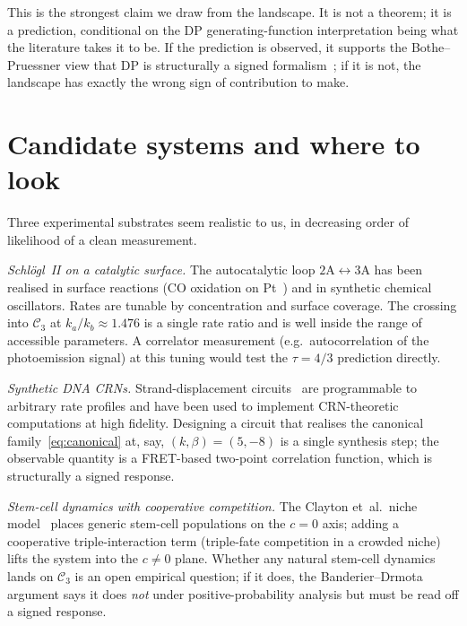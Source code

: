 \documentclass[11pt,a4paper]{article}
\newcommand{\Ck}{\mathcal{C}}
\theoremstyle{plain}
\theoremstyle{remark}
\begin{document}
This is the strongest claim we draw from the landscape.  It is
not a theorem; it is a prediction, conditional on the DP
generating-function interpretation being what the literature
takes it to be.  If the prediction is observed, it supports the
Bothe--Pruessner view that DP is structurally a signed
formalism~\citep{Bothe2023,PruessnerGarciaMillan2025}; if it is
not, the landscape has exactly the wrong sign of contribution
to make.

\section{Candidate systems and where to look}
\label{sec:candidates}

Three experimental substrates seem realistic to us, in
decreasing order of likelihood of a clean measurement.

\emph{Schlögl~II on a catalytic surface.}  The autocatalytic
loop $2\mathrm{A}\leftrightarrow 3\mathrm{A}$ has been realised
in surface reactions (CO oxidation on Pt~\citep{ImbihlErtl1995})
and in synthetic chemical oscillators.  Rates are tunable by
concentration and surface coverage.  The crossing into $\Ck_{3}$
at $k_{a}/k_{b}\approx 1.476$ is a single rate ratio and is
well inside the range of accessible parameters.  A correlator
measurement (e.g.\ autocorrelation of the photoemission signal)
at this tuning would test the $\tau = 4/3$ prediction directly.

\emph{Synthetic DNA CRNs.}  Strand-displacement
circuits~\citep{SoloveichikWinfreeQian2010} are programmable to
arbitrary rate profiles and have been used to implement
CRN-theoretic computations at high fidelity.  Designing a
circuit that realises the canonical
family~\eqref{eq:canonical} at, say, $(k,\beta)=(5,-8)$ is a
single synthesis step; the observable quantity is a FRET-based
two-point correlation function, which is structurally a signed
response.

\emph{Stem-cell dynamics with cooperative competition.}  The
Clayton et~al.~niche model~\citep{ClaytonEtAl2007} places
generic stem-cell populations on the $c=0$ axis; adding a
cooperative triple-interaction term (triple-fate competition in
a crowded niche) lifts the system into the $c\neq 0$ plane.
Whether any natural stem-cell dynamics lands on $\Ck_{3}$ is an
open empirical question; if it does, the Banderier--Drmota
argument says it does \emph{not} under positive-probability
analysis but must be read off a signed response.
\end{document}

